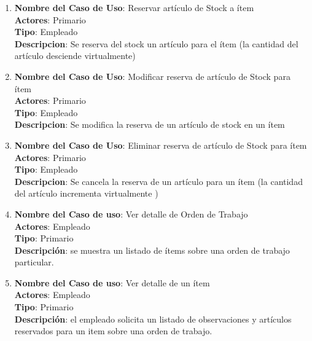 \documentclass[12pt]{extarticle}
\begin{document}
\begin{spacing}{1.2}
\begin{enumerate}
            \item 	\textbf{Nombre del Caso de Uso}: Reservar artículo de Stock a ítem\\
                    \textbf{Actores}: Primario\\
                    \textbf{Tipo}: Empleado\\
                    \textbf{Descripcion}: Se reserva del stock un artículo para el ítem (la cantidad del artículo desciende virtualmente)

            \item 	\textbf{Nombre del Caso de Uso}: Modificar reserva de artículo de Stock para ítem\\
                    \textbf{Actores}: Primario\\
                    \textbf{Tipo}: Empleado\\
                    \textbf{Descripcion}: Se modifica la reserva de un artículo de stock en un ítem

            \item 	\textbf{Nombre del Caso de Uso}: Eliminar reserva de artículo de Stock para ítem\\
                    \textbf{Actores}: Primario\\
                    \textbf{Tipo}: Empleado\\
                    \textbf{Descripcion}: Se cancela la reserva de un artículo para un ítem (la cantidad del artículo incrementa virtualmente	)
            
            \item 	\textbf{Nombre del Caso de uso}: Ver detalle de Orden de Trabajo\\
                    \textbf{Actores}: Empleado\\
                    \textbf{Tipo}: Primario\\
                    \textbf{Descripción}: se muestra un listado de ítems sobre una orden de trabajo particular.

            \item 	\textbf{Nombre del Caso de uso}: Ver detalle de un ítem\\
                    \textbf{Actores}: Empleado\\
                    \textbf{Tipo}: Primario\\
                    \textbf{Descripción}: el empleado solicita un listado de observaciones y artículos reservados para un item sobre una orden de trabajo.




\end{enumerate}
\end{spacing}
\end{document}
